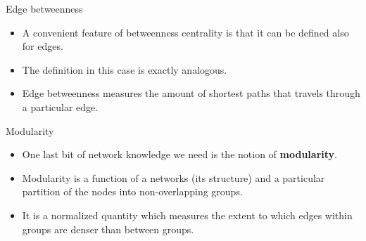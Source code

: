 \documentclass[
    hyperref={colorlinks,linkcolor=blue,urlcolor=blue,citecolor=blue}
]{beamer}
\begin{document}
\begin{frame}{Edge betweenness}
\begin{itemize}
    \item<1-> A convenient feature of betweenness centrality is that
    it can be defined also for edges.
    \item<2-> The definition in this case is exactly analogous.
    \item<3-> Edge betweenness measures the amount of shortest paths
    that travels through a particular edge.
\end{itemize}
\end{frame}

\begin{frame}{Modularity}
\begin{itemize}
    \item<1-> One last bit of network knowledge we need is the notion of
    \textbf{modularity}.
    \item<2-> Modularity is a function of a networks (its structure) and
    a particular partition of the nodes into non-overlapping groups.
    \item<3-> It is a normalized quantity which measures the extent to which
    edges within groups are denser than between groups.
\end{itemize}
\end{frame}
\end{document}
